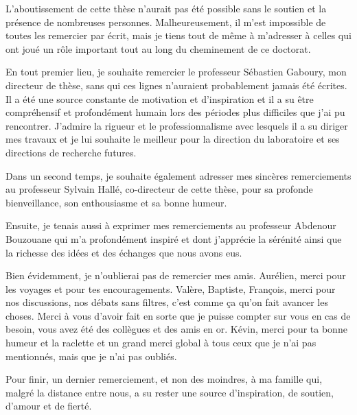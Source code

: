\begin{ack}

L'aboutissement de cette thèse  n'aurait pas été possible sans le soutien et la présence de nombreuses personnes. Malheureusement, il m'est impossible de toutes les remercier par écrit, mais je tiens tout de même à m'adresser à celles qui ont joué un rôle important tout au long du cheminement de ce doctorat.

En tout premier lieu, je souhaite remercier le professeur Sébastien Gaboury, mon directeur de thèse, sans qui ces lignes n'auraient probablement jamais été écrites. Il a été une source constante de motivation et d’inspiration et il a su être compréhensif et profondément humain lors des périodes plus difficiles que j'ai pu rencontrer. J'admire la rigueur et le professionnalisme avec lesquels il a su diriger mes travaux et je lui souhaite le meilleur pour la direction du laboratoire et ses directions de recherche futures.

Dans un second temps, je souhaite également adresser mes sincères remerciements au professeur Sylvain Hallé, co-directeur de cette thèse, pour sa profonde bienveillance, son enthousiasme et sa bonne humeur.

Ensuite, je tenais aussi à exprimer mes remerciements au professeur Abdenour Bouzouane qui m'a profondément inspiré et dont j'apprécie la sérénité ainsi que la richesse des idées et des échanges que nous avons eus.

Bien évidemment, je n'oublierai pas de remercier mes amis. Aurélien, merci pour les voyages et pour tes encouragements. Valère, Baptiste, François, merci pour nos discussions, nos débats sans filtres, c'est comme ça qu'on fait avancer les choses. Merci à vous d'avoir fait en sorte que je puisse compter sur vous en cas de besoin, vous avez été des collègues et des amis en or. Kévin, merci pour ta bonne humeur et la raclette et un grand merci global à tous ceux que je n'ai pas mentionnés, mais que je n'ai pas oubliés.

Pour finir, un dernier remerciement, et non des moindres, à ma famille qui, malgré la distance entre nous, a su rester une source d’inspiration, de soutien, d’amour et de fierté.

\end{ack}
